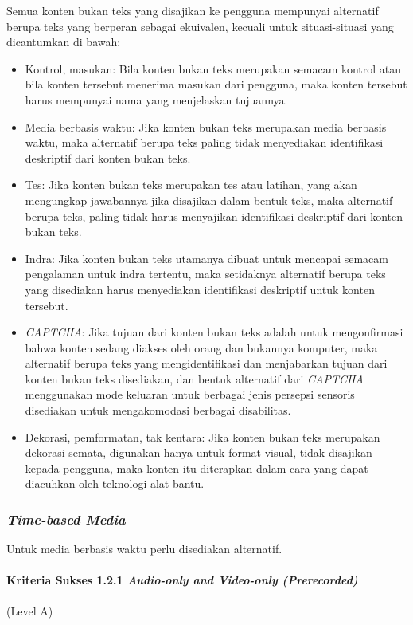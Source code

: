 Semua konten bukan teks yang disajikan ke pengguna mempunyai alternatif berupa teks yang berperan sebagai ekuivalen, kecuali untuk situasi-situasi yang dicantumkan di bawah:
\begin{itemize}
	\item Kontrol, masukan: Bila konten bukan teks merupakan semacam kontrol atau bila konten tersebut menerima masukan dari pengguna, maka konten tersebut harus mempunyai nama yang menjelaskan tujuannya.
	\item Media berbasis waktu: Jika konten bukan teks merupakan media berbasis waktu, maka alternatif berupa teks paling tidak menyediakan identifikasi deskriptif dari konten bukan teks.
	\item Tes: Jika konten bukan teks merupakan tes atau latihan, yang akan mengungkap jawabannya jika disajikan dalam bentuk teks, maka alternatif berupa teks, paling tidak harus menyajikan identifikasi deskriptif dari konten bukan teks.
	\item Indra: Jika konten bukan teks utamanya dibuat untuk mencapai semacam pengalaman untuk indra tertentu, maka setidaknya alternatif berupa teks yang disediakan harus menyediakan identifikasi deskriptif untuk konten tersebut.
	\item \textit{CAPTCHA}: Jika tujuan dari konten bukan teks adalah untuk mengonfirmasi bahwa konten sedang diakses oleh orang dan bukannya komputer, maka alternatif berupa teks yang mengidentifikasi dan menjabarkan tujuan dari konten bukan teks disediakan, dan bentuk alternatif dari \textit{CAPTCHA} menggunakan mode keluaran untuk berbagai jenis persepsi sensoris disediakan untuk mengakomodasi berbagai disabilitas.
	\item Dekorasi, pemformatan, tak kentara: Jika konten bukan teks merupakan dekorasi semata, digunakan hanya untuk format visual, tidak disajikan kepada pengguna, maka konten itu diterapkan dalam cara yang dapat diacuhkan oleh teknologi alat bantu.
\end{itemize}

\subsubsection{\textit{Time-based Media}}
\label{sec:time_based_media}
Untuk media berbasis waktu perlu disediakan alternatif.

\paragraph{Kriteria Sukses 1.2.1 \textit{Audio-only and Video-only (Prerecorded)}}
\label{sec:kriteria_sukses_1.2.1}
(Level A)\\

